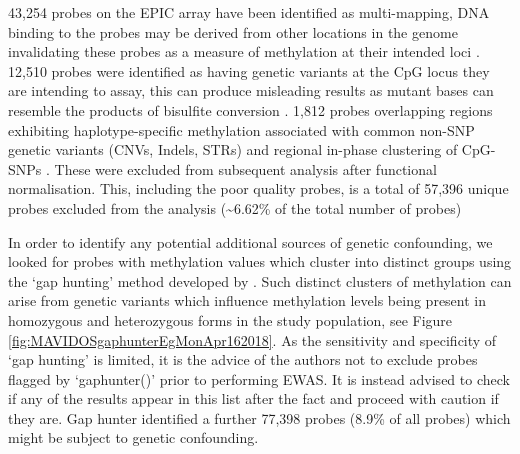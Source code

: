 \documentclass[
]{book}
\begin{document}
43,254 probes on the EPIC array have been identified as multi-mapping, DNA binding to the probes may be derived from other locations in the genome invalidating these probes as a measure of methylation at their intended loci \citep{Pidsley2016}.
12,510 probes were identified as having genetic variants at the CpG locus they are intending to assay, this can produce misleading results as mutant bases can resemble the products of bisulfite conversion \citep{Pidsley2016}.
1,812 probes overlapping regions exhibiting haplotype-specific methylation associated with common non-SNP genetic variants (CNVs, Indels, STRs) and regional in-phase clustering of CpG-SNPs \citep{Bell2017a}.
These were excluded from subsequent analysis after functional normalisation.
This, including the poor quality probes, is a total of 57,396 unique probes excluded from the analysis (\textasciitilde6.62\% of the total number of probes)

In order to identify any potential additional sources of genetic confounding, we looked for probes with methylation values which cluster into distinct groups using the `gap hunting' method developed by \citet{Andrews2016}.
Such distinct clusters of methylation can arise from genetic variants which influence methylation levels being present in homozygous and heterozygous forms in the study population, see Figure \ref{fig:MAVIDOSgaphunterEgMonApr162018}.
As the sensitivity and specificity of `gap hunting' is limited, it is the advice of the authors not to exclude probes flagged by `gaphunter()' prior to performing EWAS.
It is instead advised to check if any of the results appear in this list after the fact and proceed with caution if they are.
Gap hunter identified a further 77,398 probes (8.9\% of all probes) which might be subject to genetic confounding.
\end{document}
